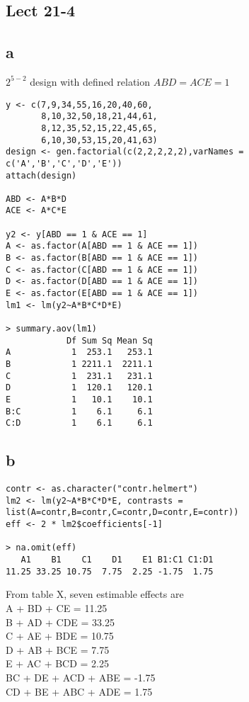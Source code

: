 \documentclass[11pt,letterpaper]{article}
\begin{document}
\subsection*{Lect 21-4}
\subsection*{a}
\noindent $2^{5-2}$ design with defined relation $ABD=ACE=1$
\begin{verbatim}
y <- c(7,9,34,55,16,20,40,60,
       8,10,32,50,18,21,44,61,
       8,12,35,52,15,22,45,65,
       6,10,30,53,15,20,41,63)
design <- gen.factorial(c(2,2,2,2,2),varNames = c('A','B','C','D','E'))
attach(design)

ABD <- A*B*D
ACE <- A*C*E

y2 <- y[ABD == 1 & ACE == 1]
A <- as.factor(A[ABD == 1 & ACE == 1])
B <- as.factor(B[ABD == 1 & ACE == 1])
C <- as.factor(C[ABD == 1 & ACE == 1])
D <- as.factor(D[ABD == 1 & ACE == 1])
E <- as.factor(E[ABD == 1 & ACE == 1])
lm1 <- lm(y2~A*B*C*D*E)

> summary.aov(lm1)
            Df Sum Sq Mean Sq
A            1  253.1   253.1
B            1 2211.1  2211.1
C            1  231.1   231.1
D            1  120.1   120.1
E            1   10.1    10.1
B:C          1    6.1     6.1
C:D          1    6.1     6.1
\end{verbatim}

\subsection*{b}
\begin{verbatim}
contr <- as.character("contr.helmert")
lm2 <- lm(y2~A*B*C*D*E, contrasts = list(A=contr,B=contr,C=contr,D=contr,E=contr)) 
eff <- 2 * lm2$coefficients[-1]

> na.omit(eff)
   A1    B1    C1    D1    E1 B1:C1 C1:D1 
11.25 33.25 10.75  7.75  2.25 -1.75  1.75 
\end{verbatim}
\noindent From table X, seven estimable effects are \\
A + BD + CE = 11.25 \\
B + AD + CDE = 33.25 \\
C + AE + BDE = 10.75 \\
D + AB + BCE = 7.75 \\
E + AC + BCD = 2.25 \\
BC + DE + ACD + ABE = -1.75 \\
CD + BE + ABC + ADE = 1.75 \\
\end{document}

